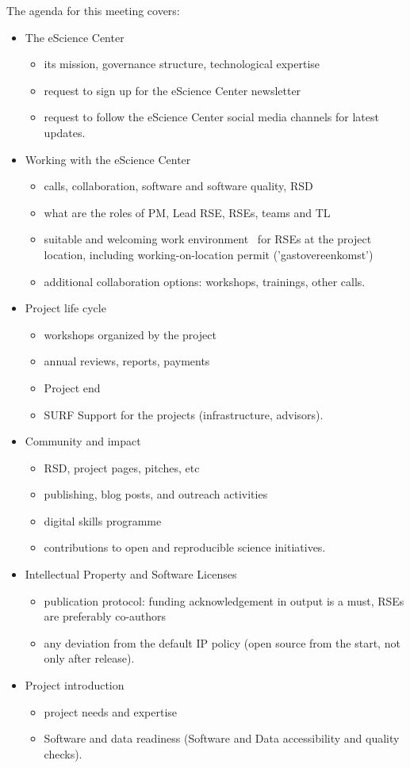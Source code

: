 \documentclass[11pt]{article}
\begin{document}
The agenda for this meeting covers:
\begin{itemize}
\item The eScience Center
\begin{itemize}
\item its mission, governance structure, technological expertise
\item request to sign up for the eScience Center newsletter
\item request to follow the eScience Center social media channels for latest updates.
\end{itemize}
\item Working with the eScience Center
\begin{itemize}
\item calls, collaboration, software and software quality, RSD
\item what are the roles of PM, Lead RSE, RSEs, teams and TL
\item suitable and welcoming work environment~\cite{arbo} for RSEs at the project location, including
working-on-location permit ('gastovereenkomst')
\item additional collaboration options: workshops, trainings, other calls.
\end{itemize}
\item Project life cycle
\begin{itemize}
\item workshops organized by the project
\item annual reviews, reports, payments
\item Project end
\item SURF Support for the projects (infrastructure, advisors).
\end{itemize}
\item Community and impact
\begin{itemize}
\item RSD, project pages, pitches, etc
\item publishing, blog posts, and outreach activities
\item digital skills programme
\item contributions to open and reproducible science initiatives.
\end{itemize}
\item Intellectual Property and Software Licenses
\begin{itemize}
\item publication protocol: funding acknowledgement in output is a must, RSEs are preferably co-authors
\item any deviation from the default IP policy (open source from the start, not only after release).
\end{itemize}
\item Project introduction
\begin{itemize}
\item project needs and expertise
\item Software and data readiness (Software and Data accessibility and quality checks).
\end{itemize}
\end{itemize}
\end{document}
